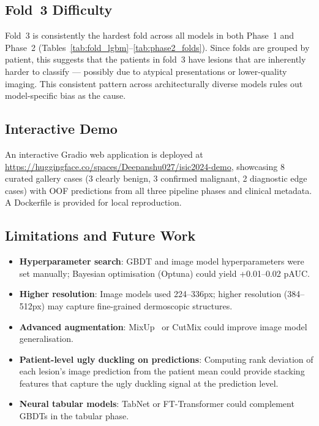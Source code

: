 \documentclass[conference]{IEEEtran}
\begin{document}
\subsection{Fold~3 Difficulty}

Fold~3 is consistently the hardest fold across all models in both
Phase~1 and Phase~2 (Tables~\ref{tab:fold_lgbm}--\ref{tab:phase2_folds}).
Since folds are grouped by patient, this suggests that the patients
in fold~3 have lesions that are inherently harder to classify ---
possibly due to atypical presentations or lower-quality imaging.
This consistent pattern across architecturally diverse models
rules out model-specific bias as the cause.

\subsection{Interactive Demo}

An interactive Gradio web application is deployed at
\url{https://huggingface.co/spaces/Deepanshu027/isic2024-demo},
showcasing 8 curated gallery cases (3 clearly benign, 3 confirmed
malignant, 2 diagnostic edge cases) with OOF predictions from all
three pipeline phases and clinical metadata.
A Dockerfile is provided for local reproduction.

\subsection{Limitations and Future Work}

\begin{itemize}[noitemsep, leftmargin=*]
  \item \textbf{Hyperparameter search}: GBDT and image model
        hyperparameters were set manually; Bayesian optimisation
        (Optuna) could yield +0.01--0.02 pAUC.
  \item \textbf{Higher resolution}: Image models used 224--336px;
        higher resolution (384--512px) may capture fine-grained
        dermoscopic structures.
  \item \textbf{Advanced augmentation}: MixUp~\cite{zhang2018mixup}
        or CutMix could improve image model generalisation.
  \item \textbf{Patient-level ugly duckling on predictions}:
        Computing rank deviation of each lesion's image prediction
        from the patient mean could provide stacking features that
        capture the ugly duckling signal at the prediction level.
  \item \textbf{Neural tabular models}: TabNet or FT-Transformer
        could complement GBDTs in the tabular phase.
\end{itemize}
\end{document}
